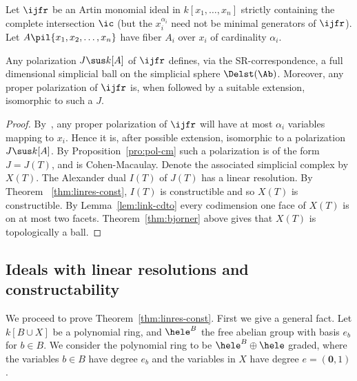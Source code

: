 \begin{theo} \label{thm:rainbow-main}
Let $\ijfr$ be an Artin monomial ideal in $k[x_1, \ldots, x_n]$
  strictly containing the
  complete intersection $\ic$ (but the $x_i^{\alpha_i}$ need not be
  minimal generators of $\ijfr$).
  Let $A \pil \{x_1, x_2, \ldots , x_n\}$  have
  fiber $A_i$ over $x_i$ of cardinality $\alpha_i$.
  
  Any polarization 
  $J \sus k[A]$ of $\ijfr$ defines, via the SR-correspondence,
  a  full dimensional  simplicial ball on the simplicial sphere $\Delst(\Ab)$.
  Moreover, any proper polarization of $\ijfr$ is,
  when followed by
  a suitable extension,
  isomorphic to such a $J$. 
\end{theo}

\begin{proof}
  By~\cite[Remark 2.5]{AFL}, any proper polarization of $\ijfr$ will have
  at most $\alpha_i$ variables mapping to $x_i$. Hence it is, after
  possible extension, isomorphic to a polarization $J \sus k[A]$. 
  By Proposition~\ref{pro:pol-cm} such a polarization is of the
  form $J = J(T)$, and is Cohen-Macaulay. Denote the
  associated  simplicial complex by $X(T)$. 
  The Alexander dual  $I(T)$ of $J(T)$ has a linear resolution. By Theorem
 ~\ref{thm:linres-const}, $I(T)$ is constructible and so $X(T)$ is
  constructible. By Lemma~\ref{lem:link-cdto} every codimension one
  face of $X(T)$ is on at most two facets. Theorem~\ref{thm:bjorner} above
  gives that $X(T)$ is topologically a ball.
\end{proof}

\setcounter{cdrthm}{4}\setcounter{equation}{4}
\subsection{Ideals with linear resolutions and constructability}
 
We proceed to prove Theorem~\ref{thm:linres-const}.
First we give a general fact. Let $k[B \cup X]$ be a polynomial ring,
and $\hele^B$ the free abelian group with basis $e_b$ for $b \in B$.
We consider the polynomial ring to be $\hele^B \oplus \hele$ graded,
where the variables  $b \in B$ have degree $e_b$ and the variables
in $X$ have degree $e = (\mathbf 0,1)$.


